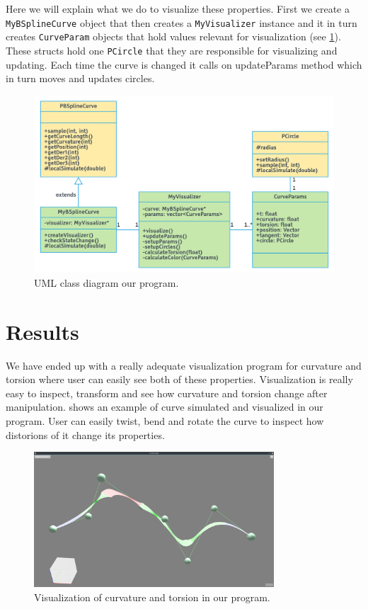 \documentclass[a4paper,12pt]{extarticle}
\newcommand{\mysection}[2]{   
  \setcounter{section}{#1}
  \section*{#2}
  \addcontentsline{toc}{section}{#2}
}
\begin{document}
Here we will explain what we do to visualize these properties. First we create a \verb|MyBSplineCurve| object that then creates a \verb|MyVisualizer| instance and it in turn creates \verb|CurveParam| objects that hold values relevant for visualization (see \cref{fig:uml}). These structs hold one \verb|PCircle| that they are responsible for visualizing and updating. Each time the curve is changed it calls on updateParams method which in turn moves and updates circles.
\begin{figure}[H]
  \centering
  \includegraphics[width=\textwidth]{KurwatureUML}
  \caption{UML class diagram our program.}
  \label{fig:uml}
\end{figure}

\mysection{3}{Results}
We have ended up with a really adequate visualization program for curvature and torsion where user can easily see both of these properties. Visualization is really easy to inspect, transform and see how curvature and torsion change after manipulation.  shows an example of curve simulated and visualized in our program. User can easily twist, bend and rotate the curve to inspect how distorions of it change its properties.
\begin{figure}[H]
  \centering
  \includegraphics[width=0.8\textwidth]{Kurwature}
  \caption{Visualization of curvature and torsion in our program.}
  \label{fig:kurwature}
\end{figure}
\end{document}
